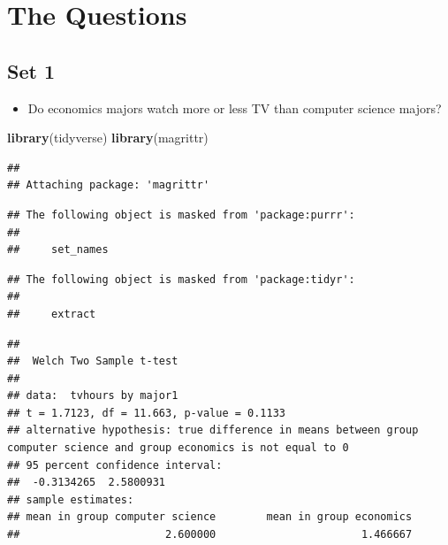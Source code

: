 \documentclass[
]{book}
\newenvironment{Shaded}{\begin{snugshade}}{\end{snugshade}}
\newcommand{\FunctionTok}[1]{\textcolor[rgb]{0.13,0.29,0.53}{\textbf{#1}}}
\newcommand{\NormalTok}[1]{#1}
\newcommand{\SpecialCharTok}[1]{\textcolor[rgb]{0.81,0.36,0.00}{\textbf{#1}}}
\newcommand{\StringTok}[1]{\textcolor[rgb]{0.31,0.60,0.02}{#1}}
\providecommand{\tightlist}{%
  \setlength{\itemsep}{0pt}\setlength{\parskip}{0pt}}
\theoremstyle{definition}
\theoremstyle{definition}
\theoremstyle{definition}
\theoremstyle{definition}
\theoremstyle{remark}
\begin{document}
\section{The Questions}\label{the-questions}

\subsection{Set 1}\label{set-1}

\begin{itemize}
\tightlist
\item
  Do economics majors watch more or less TV than computer science majors?
\end{itemize}

\begin{Shaded}
\begin{Highlighting}[]
\FunctionTok{library}\NormalTok{(tidyverse)}
\FunctionTok{library}\NormalTok{(magrittr)}
\end{Highlighting}
\end{Shaded}

\begin{verbatim}
## 
## Attaching package: 'magrittr'
\end{verbatim}

\begin{verbatim}
## The following object is masked from 'package:purrr':
## 
##     set_names
\end{verbatim}

\begin{verbatim}
## The following object is masked from 'package:tidyr':
## 
##     extract
\end{verbatim}

\begin{Shaded}
\end{Shaded}

\begin{verbatim}
## 
##  Welch Two Sample t-test
## 
## data:  tvhours by major1
## t = 1.7123, df = 11.663, p-value = 0.1133
## alternative hypothesis: true difference in means between group computer science and group economics is not equal to 0
## 95 percent confidence interval:
##  -0.3134265  2.5800931
## sample estimates:
## mean in group computer science        mean in group economics 
##                       2.600000                       1.466667
\end{verbatim}
\end{document}
